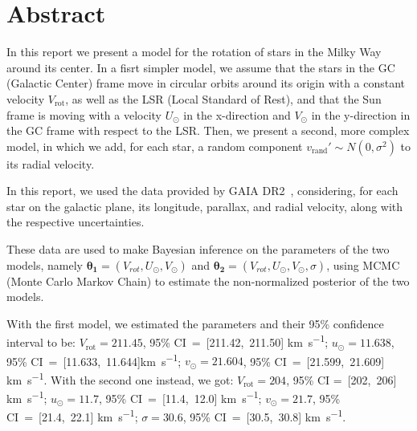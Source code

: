\section*{Abstract}

In this report we present a model for the rotation of stars in the Milky Way around its center.
In a fisrt simpler model, we assume that the stars in the GC (Galactic Center) frame move in circular orbits around its origin with a constant velocity $V_{\text{rot}}$, as well as the LSR (Local Standard of Rest), and that the Sun frame is moving with a velocity $U_{\odot}$ in the x-direction and $V_{\odot}$ in the y-direction in the GC frame with respect to the LSR. Then, we present a second, more complex model, in which we add, for each star, a random component $v_{\text{rand}}' \sim N(0, \sigma^2)$ to its radial velocity.



In this report, we used the data provided by GAIA DR2~\cite{GAIADR2}, considering, for each star on the galactic plane, its longitude, parallax, and radial velocity, along with the respective uncertainties.

These data are used to make Bayesian inference on the parameters of the two models, namely $\mathbf{\theta_1} = (V_{rot}, U_{\odot}, V_{\odot})$ and $\mathbf{\theta_2} = (V_{rot}, U_{\odot}, V_{\odot}, \sigma)$, using MCMC (Monte Carlo Markov Chain) to estimate the non-normalized posterior of the two models. 

With the first model, we estimated the parameters and their 95\% confidence interval to be: $V_{\text{rot}} = 211.45$, 95\% CI~=~[211.42,~211.50] \unit{\kilo\meter\per\second}; $u_{\odot} = 11.638$, 95\% CI~=~[11.633,~11.644]\unit{\kilo\meter\per\second}; $v_{\odot} = 21.604$, 95\% CI~=~[21.599,~21.609] \unit{\kilo\meter\per\second}. With the second one instead, we got: $V_{\text{rot}}= 204$, 95\% CI =~[202,~206] \unit{\kilo\meter\per\second}; $u_{\odot} = 11.7$, 95\% CI~=~[11.4,~12.0] \unit{\kilo\meter\per\second}; $v_{\odot} = 21.7$, 95\% CI~=~[21.4,~22.1] \unit{\kilo\meter\per\second}; $\sigma = 30.6$, 95\% CI~=~[30.5,~30.8] \unit{\kilo\meter\per\second}. 

